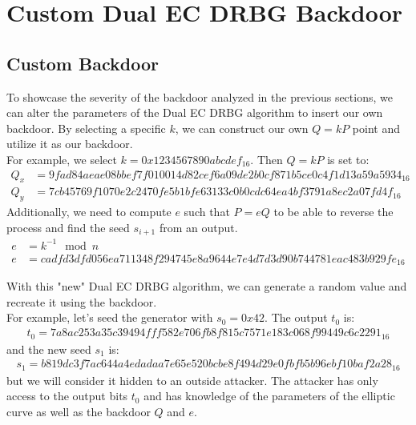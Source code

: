 \section{Custom Dual EC DRBG Backdoor}

\subsection{Custom Backdoor}

To showcase the severity of the backdoor analyzed in the previous sections, we can alter the parameters of the Dual EC DRBG algorithm to insert our own backdoor. By selecting a specific $k$, we can construct our own $Q = kP$ point and utilize it as our backdoor.
\\

For example, we select $k = 0x1234567890abcdef_{16}$. Then $Q = kP$ is set to:
\begin{align*}
    Q_x &= 9fad84aeae08bbef7f010014d82cef6a09de2b0cf871b5ce0c4f1d13a59a5934_{16}\\
    Q_y &= 7cb45769f1070e2c2470fe5b1bfe63133c0b0cdc64ea4bf3791a8ec2a07fd4f_{16}
\end{align*}
\noindent
Additionally, we need to compute $e$ such that $P = eQ$ to be able to reverse the process and find the seed $s_{i + 1}$ from an output.
\begin{align*}
    e &= k^{-1} \mod n\\
    e &= cadfd3dfd056ea711348f294745e8a9644e7e4d7d3d90b744781eac483b929fe_{16}
\end{align*}

\noindent
With this "new" Dual EC DRBG algorithm, we can generate a random value and recreate it using the backdoor.
\\

\noindent
For example, let's seed the generator with $s_0 = 0x42$. The output $t_0$ is:
\begin{align*}
    t_0 = 7a8ac253a35c39494fff582e706fb8f815c7571e183c068f99449c6c2291_{16}
\end{align*}
and the new seed $s_1$ is:
\begin{align*}
    s_1 = b819dc3f7ac644a4edadaa7e65e520bcbe8f494d29e0fbfb5b96ebf10baf2a28_{16}
\end{align*}
but we will consider it hidden to an outside attacker. The attacker has only access to the output bits $t_0$ and has knowledge of the parameters of the elliptic curve as well as the backdoor $Q$ and $e$.
\\

